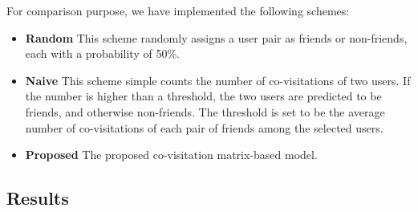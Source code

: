 For comparison purpose, we have implemented the following schemes:
\begin{itemize}
\item \textbf{Random} This scheme randomly assigns a user pair as friends or non-friends, each with a probability of 50\%.

\item \textbf{Naive} This scheme simple counts the number of co-visitations of two users. If the number is higher than a threshold, the two users are predicted to be friends, and otherwise non-friends. The threshold is set to be the average number of co-visitations of each pair of friends among the selected users.

\item \textbf{Proposed} The proposed co-visitation matrix-based model.
\end{itemize}



\subsection{Results}


